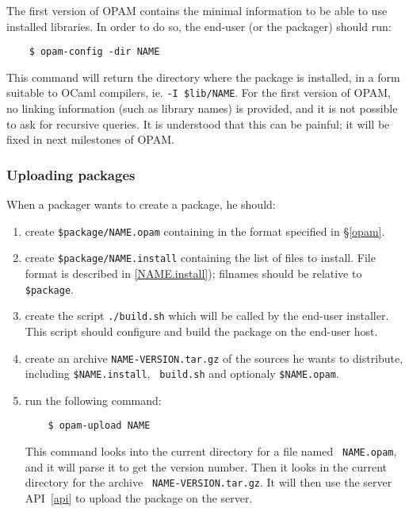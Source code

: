 \documentclass[a4paper,11pt]{article}
\begin{document}
The first version of OPAM contains the minimal information to be able
to use installed libraries. In order to do so, the end-user (or the
packager) should run:

\begin{verbatim}
    $ opam-config -dir NAME
\end{verbatim}

This command will return the directory where the package is installed,
in a form suitable to OCaml compilers, ie. {\tt -I \$lib/NAME}. For
the first version of OPAM, no linking information (such as library
names) is provided, and it is not possible to ask for recursive
queries. It is understood that this can be painful; it will be
fixed in next milestones of OPAM.

\subsubsection{Uploading packages}
\label{upload}

When a packager wants to create a package, he should:

\begin{enumerate}

\item create {\tt \$package/NAME.opam} containing in the format
  specified in \S\ref{opam}.

\item create {\tt \$package/NAME.install} containing the list of files
  to install. File format is described in \ref{NAME.install});
  filnames should be relative to {\tt \$package}.

\item create the script {\tt ./build.sh} which will be called by the
  end-user installer. This script should configure and build the
  package on the end-user host.

\item create an archive {\tt NAME-VERSION.tar.gz} of the sources he
  wants to distribute, including {\tt \$NAME.install}, {\tt
    build.sh} and optionaly {\tt \$NAME.opam}.

\item run the following command:

\begin{verbatim}
    $ opam-upload NAME
\end{verbatim}

This command looks into the current directory for a file named {\tt
  NAME.opam}, and it will parse it to get the version number. Then it
looks in the current directory for the archive {\tt
  NAME-VERSION.tar.gz}. It will then use the server API~\ref{api} to
upload the package on the server.

\end{enumerate}
\end{document}
